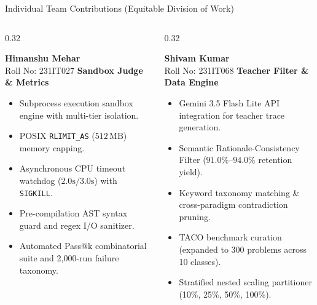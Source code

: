 \documentclass[aspectratio=169,10pt]{beamer}
\begin{document}
\begin{frame}{Individual Team Contributions (Equitable Division of Work)}
  \begin{columns}[T]
    \begin{column}{0.32\textwidth}
      \begin{block}{\textbf{Himanshu Mehar}\\[1pt]\scriptsize Roll No: 231IT027}
        \textbf{Sandbox Judge \& Metrics}
        \vspace{2pt}
        \begin{itemize}\itemsep=2pt\tiny
          \item Subprocess execution sandbox engine with multi-tier isolation.
          \item POSIX \texttt{RLIMIT\_AS} ($512\,\text{MB}$) memory capping.
          \item Asynchronous CPU timeout watchdog ($2.0\text{s}/3.0\text{s}$) with \texttt{SIGKILL}.
          \item Pre-compilation AST syntax guard and regex I/O sanitizer.
          \item Automated Pass@k combinatorial suite and 2,000-run failure taxonomy.
        \end{itemize}
      \end{block}
    \end{column}

    \begin{column}{0.32\textwidth}
      \begin{block}{\textbf{Shivam Kumar}\\[1pt]\scriptsize Roll No: 231IT068}
        \textbf{Teacher Filter \& Data Engine}
        \vspace{2pt}
        \begin{itemize}\itemsep=2pt\tiny
          \item Gemini 3.5 Flash Lite API integration for teacher trace generation.
          \item Semantic Rationale-Consistency Filter ($91.0\%\text{--}94.0\%$ retention yield).
          \item Keyword taxonomy matching \& cross-paradigm contradiction pruning.
          \item TACO benchmark curation (expanded to 300 problems across 10 classes).
          \item Stratified nested scaling partitioner (10\%, 25\%, 50\%, 100\%).
        \end{itemize}
      \end{block}
    \end{column}


\end{columns}
\end{frame}
\end{document}
